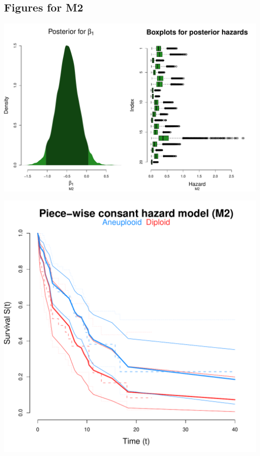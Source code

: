 \documentclass[12pt]{article}
\begin{document}
\newpage
\subsection*{Figures for M2}
\begin{center}
\includegraphics[scale=0.60]{figs/m2_post.pdf}
\bigskip
\bigskip

\includegraphics[scale=0.45]{figs/m2_surv.pdf}
\end{center}

\newpage
\end{document}
